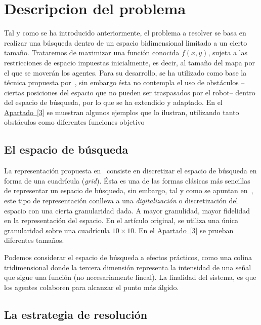 \documentclass[runningheads]{llncs}
\newcommand{\refcruzada}[2]{\hyperref[#2]{#1~\ref{#2}}}
\begin{document}
    \section{Descripcion del problema}
    \label{sec:descripcion}

    Tal y como se ha introducido anteriormente, el problema a resolver se basa en realizar una búsqueda dentro de un
    espacio bidimensional limitado a un cierto tamaño. Trataremos de maximizar una función conocida $f(x,y)$, sujeta
    a las restricciones de espacio impuestas inicialmente, es decir, al tamaño del mapa por el que se moverán los agentes.
    Para su desarrollo, se ha utilizado como base la técnica propuesta por~\cite{initialPaper}, sin embargo ésta no
    contempla el uso de obstáculos --ciertas posiciones del espacio que no pueden ser traspasados por el robot-- dentro
    del espacio de búsqueda, por lo que se ha extendido y adaptado.
    En el \refcruzada{Apartado}{3} se muestran algunos ejemplos que lo ilustran, utilizando tanto obstáculos como
    diferentes funciones objetivo %


    \subsection{El espacio de búsqueda}
    La representación propuesta en~\cite{initialPaper} consiste en discretizar el espacio de búsqueda en forma de una
    cuadrícula (\textit{grid}). Ésta es una de las formas clásicas más sencillas de representar un espacio de búsqueda,
    sin embargo, tal y como se apuntan en~\cite{AIRobotics}, este tipo de representación conlleva a una
    \textit{digitalización} o discretización del espacio con una cierta granularidad dada. A mayor granulidad,
    mayor fidelidad en la representación del espacio. En el artículo original, se utiliza una única granularidad
    sobre una cuadrícula $10 \times 10$. En el \refcruzada{Apartado}{3} se prueban diferentes tamaños. %

    Podemos considerar el espacio de búsqueda a efectos prácticos, como una colina tridimensional donde la tercera
    dimensión representa la intensidad de una señal que sigue una función (no necesariamente lineal). La finalidad
    del sistema, es que los agentes colaboren para alcanzar el punto más álgido.

    \subsection{La estrategia de resolución}
\end{document}
